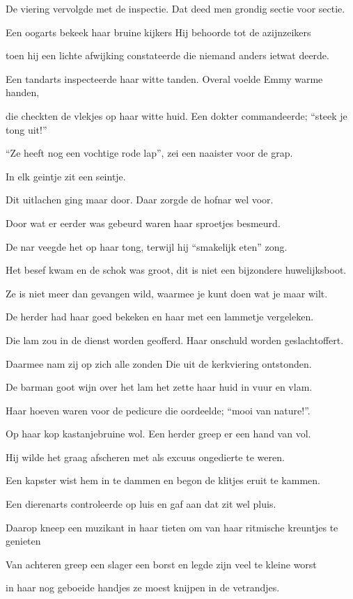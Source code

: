 De viering vervolgde met de inspectie.
Dat deed men grondig sectie voor sectie.

Een oogarts bekeek haar bruine kijkers
Hij behoorde tot de azijnzeikers

toen hij een lichte afwijking constateerde
die niemand anders ietwat deerde.

Een tandarts inspecteerde haar witte tanden.
Overal voelde Emmy warme handen,

die checkten de vlekjes op haar witte huid.
Een dokter commandeerde; “steek je tong uit!”

“Ze heeft nog een vochtige rode lap”,
zei een naaister voor de grap.

In elk geintje
zit een seintje.

Dit uitlachen ging maar door.
Daar zorgde de hofnar wel voor.

Door wat er eerder was gebeurd
waren haar sproetjes besmeurd.

De nar veegde het op haar tong,
terwijl hij “smakelijk eten” zong.

Het besef kwam en de schok was groot,
dit is niet een bijzondere huwelijksboot.

Ze is niet meer dan gevangen wild,
waarmee je kunt doen wat je maar wilt.

De herder had haar goed bekeken
en haar met een lammetje vergeleken.

Die lam zou in de dienst worden geofferd.
Haar onschuld worden geslachtoffert.

Daarmee nam zij op zich alle zonden
Die uit de kerkviering ontstonden.

De barman goot wijn over het lam
het zette haar huid in vuur en vlam.

Haar hoeven waren voor de pedicure
die oordeelde; “mooi van nature!”.

Op haar kop kastanjebruine wol.
Een herder greep er een hand van vol.

Hij wilde het graag afscheren
met als excuus ongedierte te weren.

Een kapster wist hem in te dammen
en begon de klitjes eruit te kammen.

Een dierenarts controleerde op luis
en gaf aan dat zit wel pluis.

Daarop kneep een muzikant in haar tieten
om van haar ritmische kreuntjes te genieten

Van achteren greep een slager een borst
en legde zijn veel te kleine worst

in haar nog geboeide handjes
ze moest knijpen in de vetrandjes.


